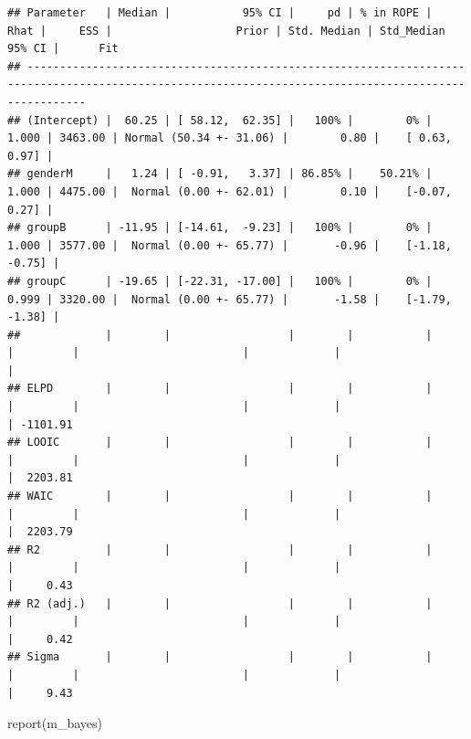 \documentclass[
  ja=standard, xelatex, base=12pt]{bxjsreport}
\newenvironment{Shaded}{\begin{snugshade}}{\end{snugshade}}
\newcommand{\FunctionTok}[1]{\textcolor[rgb]{0.00,0.00,0.00}{#1}}
\newcommand{\NormalTok}[1]{#1}
\begin{document}
\begin{verbatim}
## Parameter   | Median |           95% CI |     pd | % in ROPE |  Rhat |     ESS |                   Prior | Std. Median | Std_Median 95% CI |      Fit
## -----------------------------------------------------------------------------------------------------------------------------------------------------
## (Intercept) |  60.25 | [ 58.12,  62.35] |   100% |        0% | 1.000 | 3463.00 | Normal (50.34 +- 31.06) |        0.80 |    [ 0.63,  0.97] |         
## genderM     |   1.24 | [ -0.91,   3.37] | 86.85% |    50.21% | 1.000 | 4475.00 |  Normal (0.00 +- 62.01) |        0.10 |    [-0.07,  0.27] |         
## groupB      | -11.95 | [-14.61,  -9.23] |   100% |        0% | 1.000 | 3577.00 |  Normal (0.00 +- 65.77) |       -0.96 |    [-1.18, -0.75] |         
## groupC      | -19.65 | [-22.31, -17.00] |   100% |        0% | 0.999 | 3320.00 |  Normal (0.00 +- 65.77) |       -1.58 |    [-1.79, -1.38] |         
##             |        |                  |        |           |       |         |                         |             |                   |         
## ELPD        |        |                  |        |           |       |         |                         |             |                   | -1101.91
## LOOIC       |        |                  |        |           |       |         |                         |             |                   |  2203.81
## WAIC        |        |                  |        |           |       |         |                         |             |                   |  2203.79
## R2          |        |                  |        |           |       |         |                         |             |                   |     0.43
## R2 (adj.)   |        |                  |        |           |       |         |                         |             |                   |     0.42
## Sigma       |        |                  |        |           |       |         |                         |             |                   |     9.43
\end{verbatim}

\begin{Shaded}
\begin{Highlighting}[]
\FunctionTok{report}\NormalTok{(m\_bayes)}
\end{Highlighting}
\end{Shaded}
\end{document}
